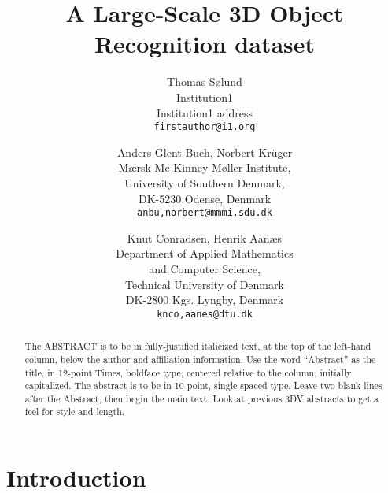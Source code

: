 \documentclass[10pt,twocolumn,letterpaper]{article}
\begin{document}
\title{A Large-Scale 3D Object Recognition dataset}

\author{Thomas S{\o}lund\\
Institution1\\
Institution1 address\\
{\tt\small firstauthor@i1.org}
\and
Anders Glent Buch, Norbert Kr\"u{}ger\\
M\ae{}rsk Mc-Kinney M\o{}ller Institute,\\
University of Southern Denmark,\\
DK-5230 Odense, Denmark \\
{\tt\small anbu,norbert@mmmi.sdu.dk}
\and
Knut Conradsen, Henrik Aanæs\\
Department of Applied Mathematics\\ and Computer Science,\\ 
Technical University of Denmark\\
DK-2800 Kgs. Lyngby, Denmark\\
{\tt\small knco,aanes@dtu.dk}
}

\maketitle

\begin{abstract}
   The ABSTRACT is to be in fully-justified italicized text, at the top
   of the left-hand column, below the author and affiliation
   information. Use the word ``Abstract'' as the title, in 12-point
   Times, boldface type, centered relative to the column, initially
   capitalized. The abstract is to be in 10-point, single-spaced type.
   Leave two blank lines after the Abstract, then begin the main text.
   Look at previous 3DV abstracts to get a feel for style and length.
\end{abstract}

\section{Introduction}


\end{document}
